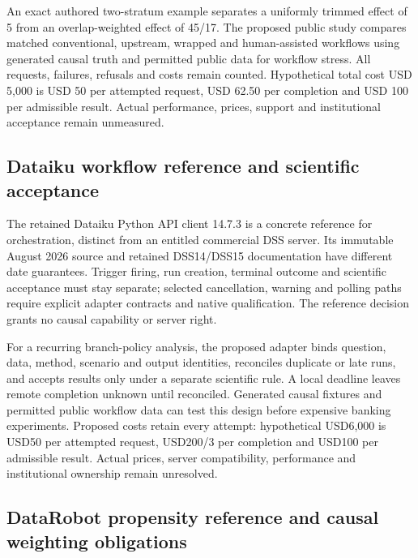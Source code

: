 An exact authored two-stratum example separates a uniformly trimmed
effect of 5 from an overlap-weighted effect of 45/17. The proposed
public study compares matched conventional, upstream, wrapped and
human-assisted workflows using generated causal truth and permitted
public data for workflow stress. All requests, failures, refusals and
costs remain counted. Hypothetical total cost USD 5,000 is USD 50 per
attempted request, USD 62.50 per completion and USD 100 per admissible
result. Actual performance, prices, support and institutional acceptance
remain unmeasured.\citep{exec25_agents_choice}

\hypertarget{dataiku-workflow-reference-and-scientific-acceptance}{%
\subsection{Dataiku workflow reference and scientific
acceptance}\label{dataiku-workflow-reference-and-scientific-acceptance}}

The retained Dataiku Python API client 14.7.3 is a concrete reference
for orchestration, distinct from an entitled commercial DSS server. Its
immutable August 2026 source and retained DSS14/DSS15 documentation have
different date guarantees. Trigger firing, run creation, terminal
outcome and scientific acceptance must stay separate; selected
cancellation, warning and polling paths require explicit adapter
contracts and native qualification. The reference decision grants no
causal capability or server
right.\citep{exec24_workflow_contracts_dataiku,exec23_dss_dss14_flow,exec23_dss_dss14_releases,exec23_dss_latest_flow,exec23_dss_latest_releases,exec25_dataiku_choice}

For a recurring branch-policy analysis, the proposed adapter binds
question, data, method, scenario and output identities, reconciles
duplicate or late runs, and accepts results only under a separate
scientific rule. A local deadline leaves remote completion unknown until
reconciled. Generated causal fixtures and permitted public workflow data
can test this design before expensive banking experiments. Proposed
costs retain every attempt: hypothetical USD6,000 is USD50 per attempted
request, USD200/3 per completion and USD100 per admissible result.
Actual prices, server compatibility, performance and institutional
ownership remain unresolved.\citep{exec25_dataiku_choice}

\hypertarget{datarobot-propensity-reference-and-causal-weighting-obligations}{%
\subsection{DataRobot propensity reference and causal weighting
obligations}\label{datarobot-propensity-reference-and-causal-weighting-obligations}}

